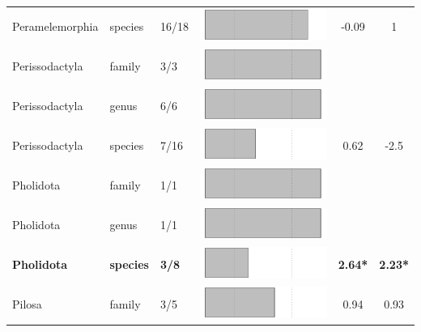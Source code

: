 \begin{longtable}{lL{1.8cm}C{2cm}lcc}
  Peramelemorphia & species & 16/18 & \includegraphics[width=0.20\linewidth, height=0.05\linewidth]{Missing_mammals/Table_figures/bar54.pdf} & -0.09 & 1 \\ 
  Perissodactyla & family & 3/3 & \includegraphics[width=0.20\linewidth, height=0.05\linewidth]{Missing_mammals/Table_figures/bar55.pdf} &   &   \\ 
  Perissodactyla & genus & 6/6 & \includegraphics[width=0.20\linewidth, height=0.05\linewidth]{Missing_mammals/Table_figures/bar56.pdf} &   &   \\ 
  Perissodactyla & species & 7/16 & \includegraphics[width=0.20\linewidth, height=0.05\linewidth]{Missing_mammals/Table_figures/bar57.pdf} & 0.62 & -2.5 \\ 
  Pholidota & family & 1/1 & \includegraphics[width=0.20\linewidth, height=0.05\linewidth]{Missing_mammals/Table_figures/bar58.pdf} &   &   \\ 
  Pholidota & genus & 1/1 & \includegraphics[width=0.20\linewidth, height=0.05\linewidth]{Missing_mammals/Table_figures/bar59.pdf} &   &   \\ 
  \textbf{Pholidota} & \textbf{species} & \textbf{3/8} & \includegraphics[width=0.20\linewidth, height=0.05\linewidth]{Missing_mammals/Table_figures/bar60.pdf} & \textbf{2.64*} & \textbf{2.23*} \\ 
  Pilosa & family & 3/5 & \includegraphics[width=0.20\linewidth, height=0.05\linewidth]{Missing_mammals/Table_figures/bar61.pdf} & 0.94 & 0.93 \\ 

\end{longtable}
